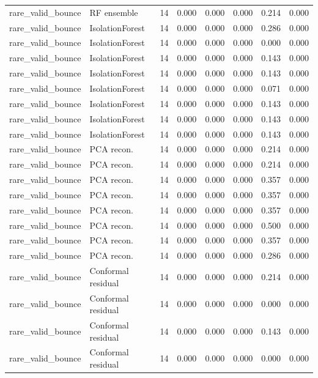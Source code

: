 {\begin{longtable}{llrrrrrr}
rare\_valid\_bounce & RF ensemble & 14 & 0.000 & 0.000 & 0.000 & 0.214 & 0.000 \\
rare\_valid\_bounce & IsolationForest & 14 & 0.000 & 0.000 & 0.000 & 0.286 & 0.000 \\
rare\_valid\_bounce & IsolationForest & 14 & 0.000 & 0.000 & 0.000 & 0.000 & 0.000 \\
rare\_valid\_bounce & IsolationForest & 14 & 0.000 & 0.000 & 0.000 & 0.143 & 0.000 \\
rare\_valid\_bounce & IsolationForest & 14 & 0.000 & 0.000 & 0.000 & 0.143 & 0.000 \\
rare\_valid\_bounce & IsolationForest & 14 & 0.000 & 0.000 & 0.000 & 0.071 & 0.000 \\
rare\_valid\_bounce & IsolationForest & 14 & 0.000 & 0.000 & 0.000 & 0.143 & 0.000 \\
rare\_valid\_bounce & IsolationForest & 14 & 0.000 & 0.000 & 0.000 & 0.143 & 0.000 \\
rare\_valid\_bounce & IsolationForest & 14 & 0.000 & 0.000 & 0.000 & 0.143 & 0.000 \\
rare\_valid\_bounce & PCA recon. & 14 & 0.000 & 0.000 & 0.000 & 0.214 & 0.000 \\
rare\_valid\_bounce & PCA recon. & 14 & 0.000 & 0.000 & 0.000 & 0.214 & 0.000 \\
rare\_valid\_bounce & PCA recon. & 14 & 0.000 & 0.000 & 0.000 & 0.357 & 0.000 \\
rare\_valid\_bounce & PCA recon. & 14 & 0.000 & 0.000 & 0.000 & 0.357 & 0.000 \\
rare\_valid\_bounce & PCA recon. & 14 & 0.000 & 0.000 & 0.000 & 0.357 & 0.000 \\
rare\_valid\_bounce & PCA recon. & 14 & 0.000 & 0.000 & 0.000 & 0.500 & 0.000 \\
rare\_valid\_bounce & PCA recon. & 14 & 0.000 & 0.000 & 0.000 & 0.357 & 0.000 \\
rare\_valid\_bounce & PCA recon. & 14 & 0.000 & 0.000 & 0.000 & 0.286 & 0.000 \\
rare\_valid\_bounce & Conformal residual & 14 & 0.000 & 0.000 & 0.000 & 0.214 & 0.000 \\
rare\_valid\_bounce & Conformal residual & 14 & 0.000 & 0.000 & 0.000 & 0.000 & 0.000 \\
rare\_valid\_bounce & Conformal residual & 14 & 0.000 & 0.000 & 0.000 & 0.143 & 0.000 \\
rare\_valid\_bounce & Conformal residual & 14 & 0.000 & 0.000 & 0.000 & 0.000 & 0.000 \\

\end{longtable}}
